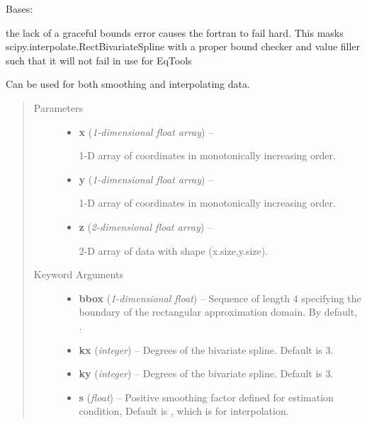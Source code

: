 \documentclass[letterpaper,10pt,english]{sphinxmanual}
\begin{document}
\begin{fulllineitems}
\label{eqtools:eqtools.trispline.RectBivariateSpline}
Bases: 

the lack of a graceful bounds error causes the fortran to fail hard.
This masks scipy.interpolate.RectBivariateSpline with a proper bound
checker and value filler such that it will not fail in use for EqTools

Can be used for both smoothing and interpolating data.
\begin{quote}\begin{description}
\item[{Parameters}] \leavevmode\begin{itemize}
\item {} 
\textbf{x} (\emph{1-dimensional float array}) --

1-D array of coordinates in monotonically increasing order.

\item {} 
\textbf{y} (\emph{1-dimensional float array}) --

1-D array of coordinates in monotonically increasing order.

\item {} 
\textbf{z} (\emph{2-dimensional float array}) --

2-D array of data with shape (x.size,y.size).

\end{itemize}

\item[{Keyword Arguments}] \leavevmode\begin{itemize}
\item {} 
\textbf{bbox} (\emph{1-dimensional float}) --
Sequence of length 4 specifying the
boundary of the rectangular approximation domain.  By default,
.

\item {} 
\textbf{kx} (\emph{integer}) --
Degrees of the bivariate spline. Default is 3.

\item {} 
\textbf{ky} (\emph{integer}) --
Degrees of the bivariate spline. Default is 3.

\item {} 
\textbf{s} (\emph{float}) --
Positive smoothing factor defined for estimation condition,
Default is , which is for interpolation.


\end{itemize}
\end{description}
\end{quote}
\end{fulllineitems}
\end{document}
